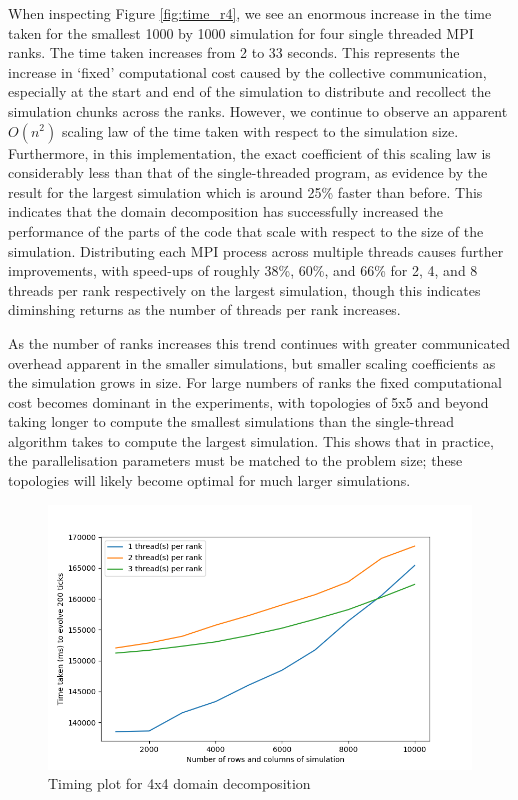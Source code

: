 \documentclass[12pt]{article}
\begin{document}
When inspecting Figure \ref{fig:time_r4}, we see an enormous increase in the time taken for the smallest 1000 by 1000 simulation for four single threaded MPI ranks.
The time taken increases from 2 to 33 seconds.
This represents the increase in `fixed' computational cost caused by the collective communication,
especially at the start and end of the simulation to distribute and recollect the simulation chunks across the ranks.
However, we continue to observe an apparent $O(n^2)$ scaling law of the time taken with respect to the simulation size.
Furthermore, in this implementation, the exact coefficient of this scaling law is considerably less than that of the single-threaded program,
as evidence by the result for the largest simulation which is around 25\% faster than before.
This indicates that the domain decomposition has successfully increased the performance of the parts of the code that scale with respect to the size of the simulation.
Distributing each MPI process across multiple threads causes further improvements,
with speed-ups of roughly 38\%, 60\%, and 66\% for 2, 4, and 8 threads per rank respectively on the largest simulation,
though this indicates diminshing returns as the number of threads per rank increases.

As the number of ranks increases this trend continues with greater communicated overhead apparent in the smaller simulations,
but smaller scaling coefficients as the simulation grows in size.
For large numbers of ranks the fixed computational cost becomes dominant in the experiments,
with topologies of 5x5 and beyond taking longer to compute the smallest simulations than the single-thread algorithm takes to compute the largest simulation.
This shows that in practice, the parallelisation parameters must be matched to the problem size; these topologies will likely become optimal for much larger simulations.

\begin{figure}[hp]
    \includegraphics[scale=0.65, center]{figures/time_hybrid_r16_plot.png}
    \caption{Timing plot for 4x4 domain decomposition}
    \label{fig:time_r16}
\end{figure}
\end{document}
